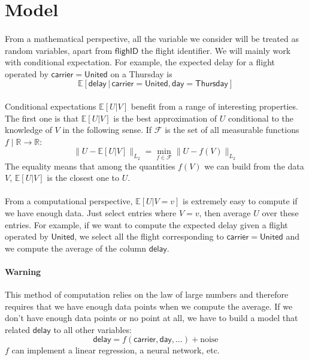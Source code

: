 \documentclass[a4paper]{article}
\begin{document}
\section{Model}

\paragraph{}
From a mathematical perspective, all the variable we consider will be treated as random variables, apart from $\mathsf{flighID}$ the flight identifier. We will mainly work with conditional expectation. For example, the expected delay for a flight operated by $\mathsf{carrier = United}$ on a Thursday is 
$$ \mathbb{E}[\mathsf{delay} \, | \, \mathsf{carrier = United}, \mathsf{day = Thursday}] $$

\paragraph{}
Conditional expectations $\mathbb{E}[U|V]$ benefit from a range of interesting properties. The first one is that $\mathbb{E}[U|V]$ is the best approximation of $U$ conditional to the knowledge of $V$ in the following sense. If $\mathcal{F}$ is the set of all measurable functions $f \; | \; \mathbb{R} \rightarrow \mathbb{R}$:
$$ \lVert U - \mathbb{E}[U|V] \rVert_{L_2} = \min_{f \in \mathcal{F}}  \lVert U - f(V) \rVert_{L_2}$$
The equality means that among the quantities $f(V)$ we can build from the data $V$, $\mathbb{E}[U|V]$ is the closest one to $U$.

\paragraph{}
From a computational perspective, $\mathbb{E}[U|V = v]$ is extremely easy to compute if we have enough data. Just select entries where $V = v$, then average $U$ over these entries. For example, if we want to compute the expected delay given a flight operated by $\mathsf{United}$, we select all the flight corresponding to $\mathsf{carrier = United}$ and we compute the average of the column $\mathsf{delay}$.

\paragraph{Warning}
This method of computation relies on the law of large numbers and therefore requires that we have enough data points when we compute the average. If we don't have enough data points or no point at all, we have to build a model that related $\mathsf{delay}$ to all other variables:
$$ \mathsf{delay} = f(\mathsf{carrier, day, \dots}) + \text{noise}$$
$f$ can implement a linear regression, a neural network, etc.
\end{document}
